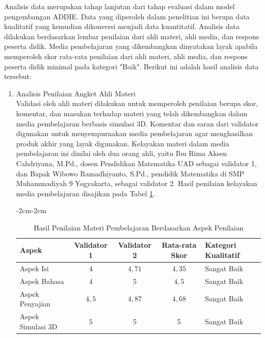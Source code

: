 \hspace{1cm}Analisis data merupakan tahap lanjutan dari tahap evaluasi dalam model pengembangan ADDIE. Data yang diperoleh dalam penelitian ini berupa data kualitatif yang kemudian dikonversi menjadi data kuantitatif. Analisis data dilakukan berdasarkan lembar penilaian dari ahli materi, ahli media, dan respons peserta didik. Media pembelajaran yang dikembangkan dinyatakan layak apabila memperoleh skor rata-rata penilaian dari ahli materi, ahli media, dan respons peserta didik minimal pada kategori "Baik". Berikut ini adalah hasil analisis data tersebut:
\begin{enumerate}
    \item Analisis Penilaian Angket Ahli Materi\\
    \hspace*{1cm}Validasi oleh ahli materi dilakukan untuk memperoleh penilaian berupa skor, komentar, dan masukan terhadap materi yang telah dikembangkan dalam media pembelajaran berbasis simulasi 3D. Komentar dan saran dari validator digunakan untuk menyempurnakan media pembelajaran agar menghasilkan produk akhir yang layak digunakan. Kelayakan materi dalam media pembelajaran ini dinilai oleh dua orang ahli, yaitu Ibu Rima Aksen Cahdriyana, M.Pd., dosen Pendidikan Matematika UAD sebagai validator 1, dan Bapak Wibowo Ramadhiyanto, S.Pd., pendidik Matematika di SMP Muhammadiyah 9 Yogyakarta, sebagai validator 2. Hasil penilaian kelayakan media pembelajaran disajikan pada Tabel \ref{penilaianmateri}.
    \begin{table}[H]
        \begin{adjustwidth}{-2cm}{-2cm}
            \centering
            \caption{Hasil Penilaian Materi Pembelajaran Berdasarkan Aspek Penilaian}
            \label{penilaianmateri}
            \begin{tabular}{|l|c|c|c|l|}
                \hline
                \textbf{Aspek} & \textbf{Validator 1} & \textbf{Validator 2} & \textbf{Rata-rata Skor} & \textbf{Kategori Kualitatif}\\
                \hline
                Aspek Isi & \(4\) & \(4{,}71\) & \(4{,}35\) & Sangat Baik\\
                Aspek Bahasa & \(4\) & 5 & \(4{,}5\) & Sangat Baik\\
                Aspek Penyajian & \(4{,}5\) & \(4{,}87\) & \(4{,}68\) & Sangat Baik\\
                Aspek Simulasi 3D & \(5\) & 5 & 5 & Sangat Baik\\
                \hline

\end{tabular}
\end{adjustwidth}
\end{table}
\end{enumerate}
